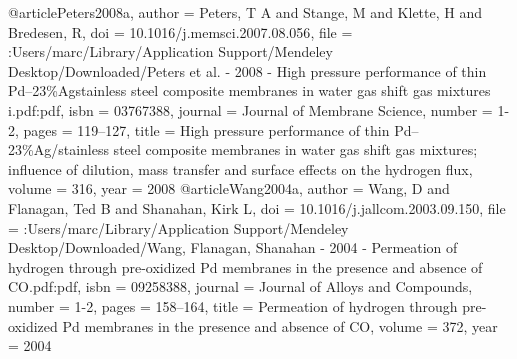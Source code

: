 @article{Peters2008a,
author = {Peters, T A and Stange, M and Klette, H and Bredesen, R},
doi = {10.1016/j.memsci.2007.08.056},
file = {:Users/marc/Library/Application Support/Mendeley Desktop/Downloaded/Peters et al. - 2008 - High pressure performance of thin Pd–23{\%}Agstainless steel composite membranes in water gas shift gas mixtures i.pdf:pdf},
isbn = {03767388},
journal = {Journal of Membrane Science},
number = {1-2},
pages = {119--127},
title = {{High pressure performance of thin Pd–23{\%}Ag/stainless steel composite membranes in water gas shift gas mixtures; influence of dilution, mass transfer and surface effects on the hydrogen flux}},
volume = {316},
year = {2008}
}
@article{Wang2004a,
author = {Wang, D and Flanagan, Ted B and Shanahan, Kirk L},
doi = {10.1016/j.jallcom.2003.09.150},
file = {:Users/marc/Library/Application Support/Mendeley Desktop/Downloaded/Wang, Flanagan, Shanahan - 2004 - Permeation of hydrogen through pre-oxidized Pd membranes in the presence and absence of CO.pdf:pdf},
isbn = {09258388},
journal = {Journal of Alloys and Compounds},
number = {1-2},
pages = {158--164},
title = {{Permeation of hydrogen through pre-oxidized Pd membranes in the presence and absence of CO}},
volume = {372},
year = {2004}
}
